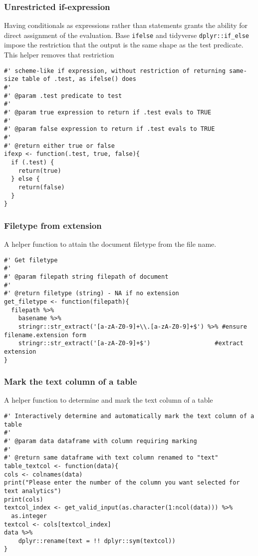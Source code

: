 \documentclass[a4paper, 11pt]{article}
\begin{document}
\subsubsection{Unrestricted if-expression}
\label{sec:orgd7e4432}
Having conditionals as expressions rather than statements grants the
ability for direct assignment of the evaluation. Base \texttt{ifelse} and
tidyverse \texttt{dplyr::if\_else} impose the restriction that the output is the same
shape as the test predicate. This helper removes that restriction
\begin{verbatim}
#' scheme-like if expression, without restriction of returning same-size table of .test, as ifelse() does
#'
#' @param .test predicate to test
#'
#' @param true expression to return if .test evals to TRUE
#'
#' @param false expression to return if .test evals to TRUE
#'
#' @return either true or false
ifexp <- function(.test, true, false){
  if (.test) {
    return(true)
  } else {
    return(false)
  }
}
\end{verbatim}
\subsubsection{Filetype from extension}
\label{sec:org37fbf72}
A helper function to attain the document filetype from the file name.
\begin{verbatim}
#' Get filetype
#'
#' @param filepath string filepath of document
#'
#' @return filetype (string) - NA if no extension
get_filetype <- function(filepath){
  filepath %>%
    basename %>%
    stringr::str_extract('[a-zA-Z0-9]+\\.[a-zA-Z0-9]+$') %>% #ensure filename.extension form
    stringr::str_extract('[a-zA-Z0-9]+$')                  #extract extension
}
\end{verbatim}
\subsubsection{Mark the text column of a table}
\label{sec:org5466408}
A helper function to determine and mark the text column of a table
\begin{verbatim}
#' Interactively determine and automatically mark the text column of a table
#'
#' @param data dataframe with column requiring marking
#'
#' @return same dataframe with text column renamed to "text"
table_textcol <- function(data){
cols <- colnames(data)
print("Please enter the number of the column you want selected for text analytics")
print(cols)
textcol_index <- get_valid_input(as.character(1:ncol(data))) %>%
  as.integer 
textcol <- cols[textcol_index]  
data %>%
    dplyr::rename(text = !! dplyr::sym(textcol))
}
\end{verbatim}
\end{document}
